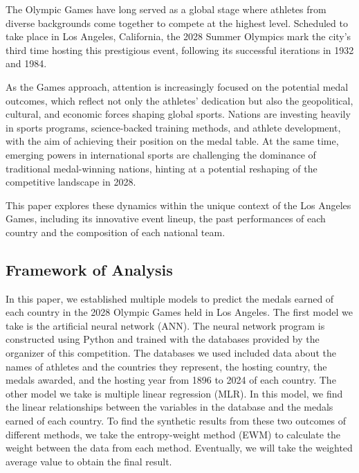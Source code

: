 \documentclass{mcmthesis}
\begin{document}
The Olympic Games have long served as a global stage where athletes from diverse backgrounds come together to compete at the highest level. Scheduled to take place in Los Angeles, California, the 2028 Summer Olympics mark the city’s third time hosting this prestigious event, following its successful iterations in 1932 and 1984.

As the Games approach, attention is increasingly focused on the potential medal outcomes, which reflect not only the athletes’ dedication but also the geopolitical, cultural, and economic forces shaping global sports. Nations are investing heavily in sports programs, science-backed training methods, and athlete development, with the aim of achieving their position on the medal table. At the same time, emerging powers in international sports are challenging the dominance of traditional medal-winning nations, hinting at a potential reshaping of the competitive landscape in 2028.

This paper explores these dynamics within the unique context of the Los Angeles Games, including its innovative event lineup, the past performances of each country and the composition of each national team.

\subsection{Framework of Analysis}
In this paper, we established multiple models to predict the medals earned of each country in the 2028 Olympic Games held in Los Angeles. The first model we take is the artificial neural network (ANN). The neural network program is constructed using Python and trained with the databases provided by the organizer of this competition. The databases we used included data about the names of athletes and the countries they represent, the hosting country, the medals awarded, and the hosting year from 1896 to 2024 of each country. The other model we take is multiple linear regression (MLR). In this model, we find the linear relationships between the variables in the database and the medals earned of each country. To find the synthetic results from these two outcomes of different methods, we take the entropy-weight method (EWM) to calculate the weight between the data from each method. Eventually, we will take the weighted average value to obtain the final result.  
\end{document}
